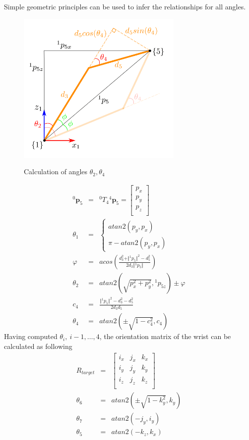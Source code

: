 Simple geometric principles can be used to infer the relationships for all angles.
\begin{center}
\begin{figure}[htbp]
\centering
\includegraphics[width=8cm]{images/th2-4-calculation.png}\\
\caption{Calculation of angles $θ_2, θ_4$}
\label{iiwa14-solution-configurations}
\end{figure}
\end{center}

\begin{eqnarray}
{}^0\mathbf{p}_5 &=& {}^0T_4 {}^4\mathbf{p}_5 = \begin{bmatrix} p_x \\ p_y \\ p_z \\ \end{bmatrix}
\\
θ_1 &=& 
\begin{cases}
atan2 \left( p_y, p_x \right) \\
π - atan2 \left( p_y, p_x \right)
\end{cases}
\\
φ &=& acos \left( \frac{d_3^2 + \Vert{}^1p_{5}\Vert ^2 - d_5^2}{2d_3 \Vert{}^1p_{5}\Vert} \right)
\\
θ_2 &=& atan2 \left( \sqrt{p_x^2 + p_y^2}, {}^1p_{5z} \right) \pm φ\\
c_4 &=& \frac{ \Vert{}^1p_{5}\Vert ^2 - d_3^2 - d_5^2 }{2d_3d_5} \nonumber\\
θ_4 &=& atan2 \left( \pm \sqrt{1 - c_4^2}, c_4 \right)
\end{eqnarray}
Having computed $\theta_i,~i-1,\ldots,4$, the orientation matrix of the wrist can be calculated as following
\begin{eqnarray}
R_{target} &=& 
\begin{bmatrix}
i_x & j_x & k_x\\
i_y & j_y & k_y\\
i_z & j_z & k_z\\
\end{bmatrix}
\nonumber
\\
θ_6 &=& atan2 \left( \pm \sqrt{1-k_y^2}, k_y \right)
\\
θ_7 &=& atan2 \left( -j_y, i_y \right)
\\
θ_5 &=& atan2 \left( - k_z, k_x \right)
\end{eqnarray}

